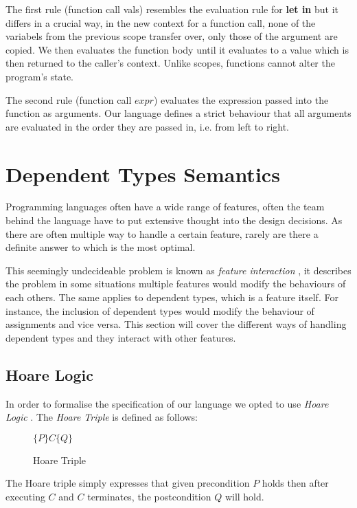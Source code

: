\documentclass[a4paper,12pt]{report}
\begin{document}
\par
The first rule (function call vals) resembles the evaluation rule for 
\textbf{let in} but it differs in a crucial way, in the new context for a 
function call, none of the variabels from the previous scope transfer over, only 
those of the argument are copied. We then evaluates the function body until it 
evaluates to a value which is then returned to the caller's context. Unlike 
scopes, functions cannot alter the program's state. 

\par
The second rule (function call $expr$) evaluates the expression passed into the 
function as arguments. Our language defines a strict behaviour that all 
arguments are evaluated in the order they are passed in, i.e. from left to right. 

\section{Dependent Types Semantics}
Programming languages often have a wide range of features, often the team behind 
the language have to put extensive thought into the design decisions. As there 
are often multiple way to handle a certain feature, rarely are there a definite 
answer to which is the most optimal.

\par
This seemingly undecideable problem is known as \textit{feature interaction} 
\cite{featInteract}, it describes the problem in some situations multiple 
features would modify the behaviours of each others. The same applies to 
dependent types, which is a feature itself. For instance, the inclusion of dependent types 
would modify the behaviour of assignments and vice versa. This section 
will cover the different ways of handling dependent types and they interact with 
other features.

\subsection{Hoare Logic}
In order to formalise the specification of our language we opted to use 
\textit{Hoare Logic} \cite{hoare}. The \textit{Hoare Triple} is defined as follows: 

\begin{figure}[H]
  \begin{center}
    $\{P\}C\{Q\}$
  \end{center}
  \caption{Hoare Triple}
\end{figure}
The Hoare triple simply expresses that given precondition $P$ holds then after executing $C$ 
and $C$ terminates, the postcondition $Q$ will hold.
\end{document}

